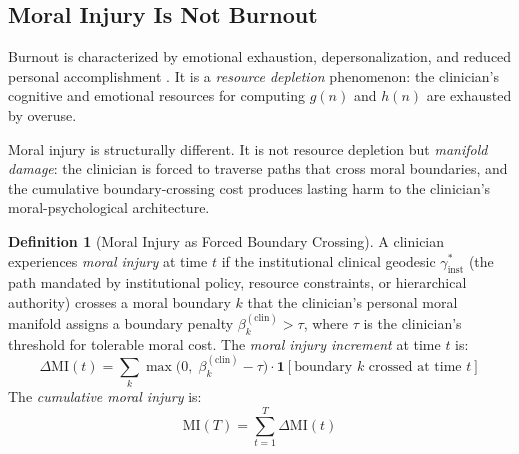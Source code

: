\documentclass[12pt]{article}
\theoremstyle{definition}
\newtheorem{definition}[theorem]{Definition}
\theoremstyle{remark}
\newcommand{\MI}{\mathrm{MI}}              %
\begin{document}
\subsection{Moral Injury Is Not Burnout}

Burnout is characterized by emotional exhaustion, depersonalization, and reduced personal accomplishment \cite{maslach1981}.  It is a \emph{resource depletion} phenomenon: the clinician's cognitive and emotional resources for computing $g(n)$ and $h(n)$ are exhausted by overuse.

Moral injury is structurally different.  It is not resource depletion but \emph{manifold damage}: the clinician is forced to traverse paths that cross moral boundaries, and the cumulative boundary-crossing cost produces lasting harm to the clinician's moral-psychological architecture.

\begin{definition}[Moral Injury as Forced Boundary Crossing]
\label{def:moral_injury}
A clinician experiences \emph{moral injury} at time $t$ if the institutional clinical geodesic $\gamma_{\text{inst}}^*$ (the path mandated by institutional policy, resource constraints, or hierarchical authority) crosses a moral boundary $k$ that the clinician's personal moral manifold assigns a boundary penalty $\beta_k^{(\text{clin})} > \tau$, where $\tau$ is the clinician's threshold for tolerable moral cost.  The \emph{moral injury increment} at time $t$ is:
\begin{equation}
\Delta \MI(t) = \sum_k \max\bigl(0,\; \beta_k^{(\text{clin})} - \tau\bigr) \cdot \mathbf{1}[\text{boundary } k \text{ crossed at time } t]
\label{eq:moral_injury}
\end{equation}
The \emph{cumulative moral injury} is:
\begin{equation}
\MI(T) = \sum_{t=1}^{T} \Delta \MI(t)
\label{eq:cumulative_mi}
\end{equation}
\end{definition}
\end{document}
